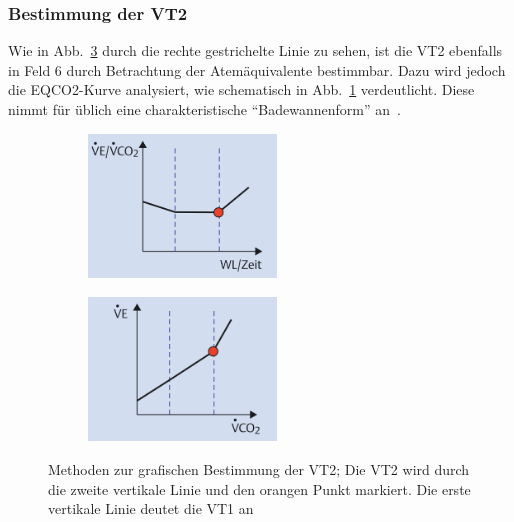\subsubsection{Bestimmung der VT2}
%
Wie in Abb.~\ref{pic:pic5} durch die rechte gestrichelte Linie zu sehen, ist die VT2 ebenfalls in Feld 6 durch Betrachtung der Atemäquivalente bestimmbar. Dazu wird jedoch die \gls{EQCO2}-Kurve analysiert, wie schematisch in Abb.~\ref{subpic:pic7} verdeutlicht. Diese nimmt für üblich eine charakteristische "`Badewannenform"' an~\cite{Kroidl.2015}.
%
\begin{figure}[H]
	\centering
	\begin{subfigure}[t]{0.45\textwidth}
		\centering
		\includegraphics[width=50mm]{Bilder/eqco2.png}
		\label{subpic:pic7}
	\end{subfigure}%
	\hfil
	\begin{subfigure}[t]{0.45\textwidth}
		\centering
		\includegraphics[width=50mm]{Bilder/field4.png}
		\label{subpic:pic8}
	\end{subfigure}
	\caption[Methoden zur grafischen Bestimmung der VT2]{Methoden zur grafischen Bestimmung der VT2; Die VT2 wird durch die zweite vertikale Linie und den orangen Punkt markiert. Die erste vertikale Linie deutet die VT1 an~\cite{Kroidl.2015}}
	\label{pic:pic5}
\end{figure}
%
